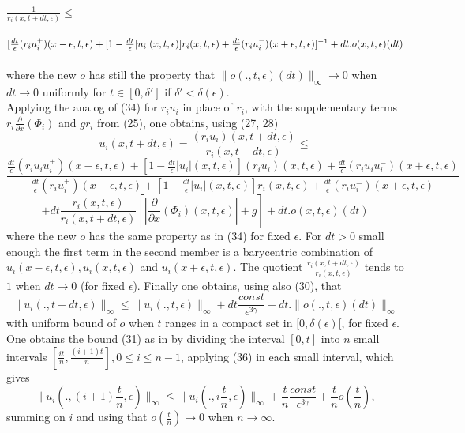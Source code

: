 \documentclass[a4paper,12pt]{article}
\begin{document}
$\frac{1}{r_i(x,t+dt,\epsilon)}\leq$\\
\\
$[\frac{dt}{\epsilon}(r_i u_i^+)(x-\epsilon,t,\epsilon)+[1-\frac{dt}{\epsilon}|u_i|(x,t,\epsilon)]r_i(x,t,\epsilon)+\frac{dt}{\epsilon}(r_i u_i^-)(x+\epsilon,t,\epsilon)]^{-1}+\\
\\
dt.o(x,t,\epsilon)(dt)$\\
\\
where the new $o$ has still the property that $\|o(.,t,\epsilon)(dt)\|_\infty \rightarrow 0$ when $dt\rightarrow 0$ uniformly for $t\in[0,\delta'] $  if $\delta'<\delta(\epsilon)$.\\
      
   
      
      Applying the analog of (34) for $r_i u_i$ in place of $r_i$, with the supplementary terms $r_i\frac{\partial}{\partial x}(\Phi_i)$ and $gr_i$ from (25),    one obtains, using (27, 28)
 $$u_i(x,t+dt,\epsilon)=\frac{(r_i u_i)(x,t+dt,\epsilon)}{r_i(x,t+dt,\epsilon)}\leq$$
$$ \frac
 {\frac{dt}{\epsilon}(r_i u_i u_i^+)(x-\epsilon,t,\epsilon)+[1-\frac{dt}{\epsilon}|u_i|(x,t,\epsilon)](r_i u_i)(x,t,\epsilon)+\frac{dt}{\epsilon}(r_i u_i u_i^-)(x+\epsilon,t,\epsilon)}
 {\frac{dt}{\epsilon}(r_i u_i^+)(x-\epsilon,t,\epsilon)+[1-\frac{dt}{\epsilon}|u_i|(x,t,\epsilon)]r_i(x,t,\epsilon)+\frac{dt}{\epsilon}(r_i u_i^-)(x+\epsilon,t,\epsilon)}$$
 \begin{equation} +dt\frac{r_i(x,t,\epsilon)}{r_i(x,t+dt,\epsilon)}[|\frac{\partial}{\partial x}(\Phi_i)(x,t,\epsilon)|+g]+ dt.o(x,t,\epsilon)(dt)\end{equation}
where the new $o$ has the same property as in (34)  for fixed $\epsilon$.
 For $dt>0$ small enough the first term  in the second member is  a  barycentric combination of $u_i(x-\epsilon,t,\epsilon),  u_i(x,t,\epsilon)$ and $ u_i(x+\epsilon,t,\epsilon)$. The quotient  $\frac{r_i(x,t+dt,\epsilon)}{r_i(x,t,\epsilon)} $ tends to $1$ when $dt\rightarrow 0$ (for fixed $\epsilon$). Finally one obtains, using also (30),  that 
 \begin{equation} \|u_i(.,t+dt,\epsilon)\|_\infty\leq  \|u_i(.,t,\epsilon)\|_\infty+dt\frac{const}{\epsilon^{3\gamma}}+dt.\|o(.,t,\epsilon)(dt)\|_\infty\end{equation}
 with uniform bound of $o$ when $t$ ranges in a compact set in $[0,\delta(\epsilon)[$,  for fixed $\epsilon$. One obtains the bound (31) as in \cite{Colombeaugravitation} by dividing the interval $[0,t]$ into $n$ small intervals $[\frac{it}{n},\frac{(i+1)t}{n}], 0\leq i \leq n-1$, applying (36) in each small interval, which gives
 $$\|u_i(.,(i+1)\frac{t}{n},\epsilon)\|_\infty \leq \|u_i(.,i\frac{t}{n},\epsilon)\|_\infty+\frac{t}{n}\frac{const}{\epsilon^{3\gamma}}+\frac{t}{n}o(\frac{t}{n}),$$
 summing on $i$ and using that $o(\frac{t}{n})\rightarrow 0$ when $n\rightarrow \infty$.\\
 
\end{document}
